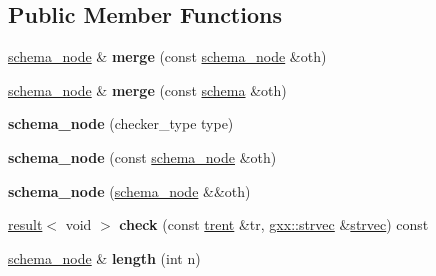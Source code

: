 \subsection*{Public Member Functions}
\begin{DoxyCompactItemize}
\item 
\hyperlink{classgxx_1_1schema_1_1schema__node}{schema\+\_\+node} \& {\bfseries merge} (const \hyperlink{classgxx_1_1schema_1_1schema__node}{schema\+\_\+node} \&oth)\hypertarget{classgxx_1_1schema_1_1schema__node_a8b9d0803322778376ebe6da07e9c9dd2}{}\label{classgxx_1_1schema_1_1schema__node_a8b9d0803322778376ebe6da07e9c9dd2}

\item 
\hyperlink{classgxx_1_1schema_1_1schema__node}{schema\+\_\+node} \& {\bfseries merge} (const \hyperlink{classgxx_1_1schema}{schema} \&oth)\hypertarget{classgxx_1_1schema_1_1schema__node_a9e77f7d07d602d6a5c90a3cabd895811}{}\label{classgxx_1_1schema_1_1schema__node_a9e77f7d07d602d6a5c90a3cabd895811}

\item 
{\bfseries schema\+\_\+node} (checker\+\_\+type type)\hypertarget{classgxx_1_1schema_1_1schema__node_abdd82aacb93a35f1b9c70bc551c21c5a}{}\label{classgxx_1_1schema_1_1schema__node_abdd82aacb93a35f1b9c70bc551c21c5a}

\item 
{\bfseries schema\+\_\+node} (const \hyperlink{classgxx_1_1schema_1_1schema__node}{schema\+\_\+node} \&oth)\hypertarget{classgxx_1_1schema_1_1schema__node_a48a5d3bef17054ab5f812beeba9234fc}{}\label{classgxx_1_1schema_1_1schema__node_a48a5d3bef17054ab5f812beeba9234fc}

\item 
{\bfseries schema\+\_\+node} (\hyperlink{classgxx_1_1schema_1_1schema__node}{schema\+\_\+node} \&\&oth)\hypertarget{classgxx_1_1schema_1_1schema__node_a23e212c3bb46448f65c8f9102281d643}{}\label{classgxx_1_1schema_1_1schema__node_a23e212c3bb46448f65c8f9102281d643}

\item 
\hyperlink{classgxx_1_1result__type_1_1result}{result}$<$ void $>$ {\bfseries check} (const \hyperlink{classgxx_1_1trent}{trent} \&tr, \hyperlink{classgxx_1_1vector}{gxx\+::strvec} \&\hyperlink{classgxx_1_1vector}{strvec}) const \hypertarget{classgxx_1_1schema_1_1schema__node_a8880383bb1bf7f785fd734ec39d13b56}{}\label{classgxx_1_1schema_1_1schema__node_a8880383bb1bf7f785fd734ec39d13b56}

\item 
\hyperlink{classgxx_1_1schema_1_1schema__node}{schema\+\_\+node} \& {\bfseries length} (int n)\hypertarget{classgxx_1_1schema_1_1schema__node_a12a6d422821313a1ca2dd54f46f1979c}{}\label{classgxx_1_1schema_1_1schema__node_a12a6d422821313a1ca2dd54f46f1979c}


\end{DoxyCompactItemize}
